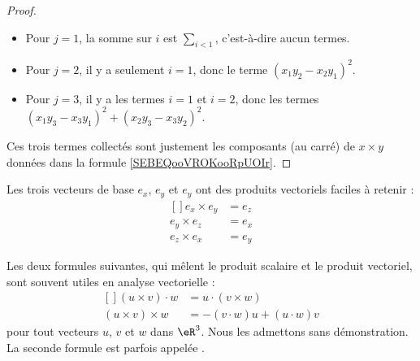 \begin{proof}
	\begin{itemize}
		\item
		      Pour \( j=1\), la somme sur \( i\) est \( \sum_{i<1}\), c'est-à-dire aucun termes.
		\item
		      Pour \( j=2\), il y a seulement \( i=1\), donc le terme \( (x_1y_2-x_2y_1)^2\).
		\item
		      Pour \( j=3\), il y a les termes \( i=1\) et \( i=2\), donc les termes \( (x_1y_3-x_3y_1)^2+(x_2y_3-x_3y_2)^2\).
	\end{itemize}
	Ces trois termes collectés sont justement les composants (au carré) de \( x\times y\) données dans la formule \eqref{SEBEQooVROKooRpUOIr}.
\end{proof}

Les trois vecteurs de base \( e_x\), \( e_y\) et \( e_y\) ont des produits vectoriels faciles à retenir :
\begin{equation}
	\begin{aligned}[]
		e_x\times e_y & =e_z \\
		e_y\times e_z & =e_x \\
		e_z\times e_x & =e_y
	\end{aligned}
\end{equation}

Les deux formules suivantes, qui mêlent le produit scalaire et le produit vectoriel, sont souvent utiles en analyse vectorielle :
\begin{equation}
	\begin{aligned}[]
		(u\times v)\cdot w  & =u\cdot(v\times w)                                   \\
		(u\times v)\times w & =-(v\cdot w)u+(u\cdot w)v     \label{EqFormExpluxxx}
	\end{aligned}
\end{equation}
pour tout vecteurs \( u\), \( v\) et \( w\) dans \( \eR^3\). Nous les admettons sans démonstration. La seconde formule est parfois appelée .

